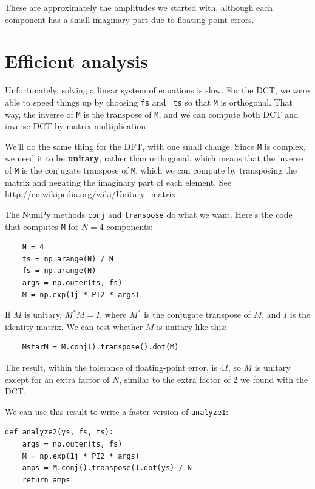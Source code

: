 \documentclass[12pt]{book}
\begin{document}
These are approximately the amplitudes we started with, although
each component has a small imaginary part due to
floating-point errors.


\section{Efficient analysis}

Unfortunately, solving a linear system of equations is slow.  For the
DCT, we were able to speed things up by choosing {\tt fs} and {\tt
  ts} so that {\tt M} is orthogonal.  That way, the inverse of {\tt M}
is the transpose of {\tt M}, and we can compute both DCT and inverse
DCT by matrix multiplication.

We'll do the same thing for the DFT, with one small change.
Since {\tt M} is complex, we need it to be {\bf unitary}, rather
than orthogonal, which means that the inverse of {\tt M} is
the conjugate transpose of {\tt M}, which we can compute by
transposing the matrix and negating the imaginary part of each
element.  See \url{http://en.wikipedia.org/wiki/Unitary_matrix}.

The NumPy methods {\tt conj} and {\tt transpose} do what we
want.  Here's the code that computes {\tt M} for $N=4$ components:

\begin{verbatim}
    N = 4
    ts = np.arange(N) / N
    fs = np.arange(N)
    args = np.outer(ts, fs)
    M = np.exp(1j * PI2 * args)
\end{verbatim}

If $M$ is unitary, $M^*M = I$, where $M^*$ is the conjugate transpose
of $M$, and $I$ is the identity matrix.  We can test whether $M$
is unitary like this:

\begin{verbatim}
    MstarM = M.conj().transpose().dot(M)
\end{verbatim}

The result, within the tolerance of floating-point error, is
$4 I$, so $M$ is unitary except for an extra factor of $N$,
similar to the extra factor of 2 we found with the DCT.

We can use this result to write a faster version of {\tt analyze1}:

\begin{verbatim}
def analyze2(ys, fs, ts):
    args = np.outer(ts, fs)
    M = np.exp(1j * PI2 * args)
    amps = M.conj().transpose().dot(ys) / N
    return amps
\end{verbatim}
\end{document}
